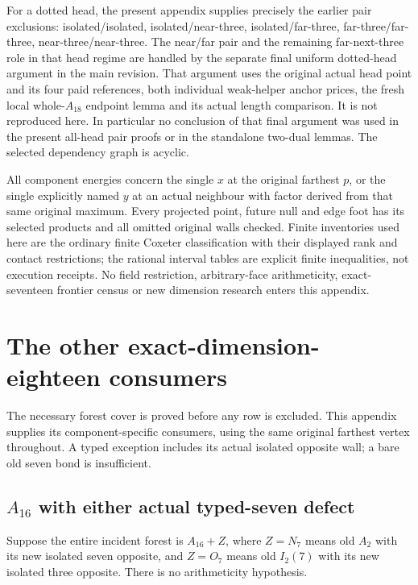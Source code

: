 \documentclass[11pt]{article}
\theoremstyle{definition}
\theoremstyle{remark}
\begin{document}
For a dotted head, the present appendix supplies precisely the
earlier pair exclusions: isolated/isolated, isolated/near-three,
isolated/far-three, far-three/far-three, near-three/near-three.
The near/far pair and the remaining far-next-three role in that
head regime are handled by the separate final uniform dotted-head
argument in the main revision.
That argument uses the original actual head point and its four
paid references, both individual weak-helper anchor prices, the
fresh local whole-\(A_{18}\) endpoint lemma and its actual length
comparison.  It is not reproduced here.
In particular no conclusion of that final argument was used in
the present all-head pair proofs or in the standalone two-dual
lemmas.  The selected dependency graph is acyclic.

All component energies concern the single \(x\) at the original
farthest \(p\), or the single explicitly named \(y\) at an actual
neighbour with factor derived from that same original maximum.
Every projected point, future null and edge foot has its selected
products and all omitted original walls checked.
Finite inventories used here are the ordinary finite Coxeter
classification with their displayed rank and contact restrictions;
the rational interval tables are explicit finite inequalities,
not execution receipts.  No field restriction, arbitrary-face
arithmeticity, exact-seventeen frontier census or new dimension
research enters this appendix.

\section{The other exact-dimension-eighteen consumers}
\label{app:otherexact18}
The necessary forest cover is proved before any row is excluded.
This appendix supplies its component-specific consumers, using the same
original farthest vertex throughout.  A typed exception includes its
actual isolated opposite wall; a bare old seven bond is insufficient.

\subsection{\(A_{16}\) with either actual typed-seven defect}
\label{app:A16typed18}
Suppose the entire incident forest is \(A_{16}+Z\), where
\(Z=N_7\) means old \(A_2\) with its new isolated seven opposite,
and \(Z=O_7\) means old \(I_2(7)\) with its new isolated three
opposite.  There is no arithmeticity hypothesis.
\end{document}
